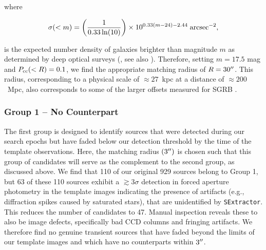 \noindent where

\begin{equation}
\sigma(<m) = \left ( \frac{1}{0.33 \ln(10)} \right ) \times 10^{0.33(m - 24) - 2.44} \; {\rm arcsec}^{-2},
\end{equation}

\noindent is the expected number density of galaxies brighter than magnitude $m$ as determined by deep optical surveys (\citealt{berger10}, see also \citealt{hogg97,bloom02,beckwith06}). Therefore, setting $m = 17.5$ mag and $P_{\rm cc}(<R) = 0.1$, we find the appropriate matching radius of $R = 30\hbox{$^{\prime\prime}$}$. This radius, corresponding to a physical scale of $\approx 27$~kpc at a distance of $\approx200$~Mpc, also corresponds to some of the larger offsets measured for SGRB \citep{fong+10,fong13,berger14}. 

\subsubsection{Group 1 -- No Counterpart}
\label{sec:group1}

The first group is designed to identify sources that were detected during our search epochs but have faded below our detection threshold by the time of the template observations. Here, the matching radius $(3 \hbox{$^{\prime\prime}$})$ is chosen such that this group of candidates will serve as the complement to the second group, as discussed above. We find that 110 of our original 929 sources belong to Group 1, but 63 of these 110 sources exhibit a $\gtrsim 3 \sigma$ detection in forced aperture photometry in the template images indicating the presence of artifacts (e.g., diffraction spikes caused by saturated stars), that are unidentified by {\tt SExtractor}. This reduces the number of candidates to 47. Manual inspection reveals these to also be image defects, specifically bad CCD columns and fringing artifacts. We therefore find no genuine transient sources that have faded beyond the limits of our template images and which have no counterparts within $3\hbox{$^{\prime\prime}$}$.

